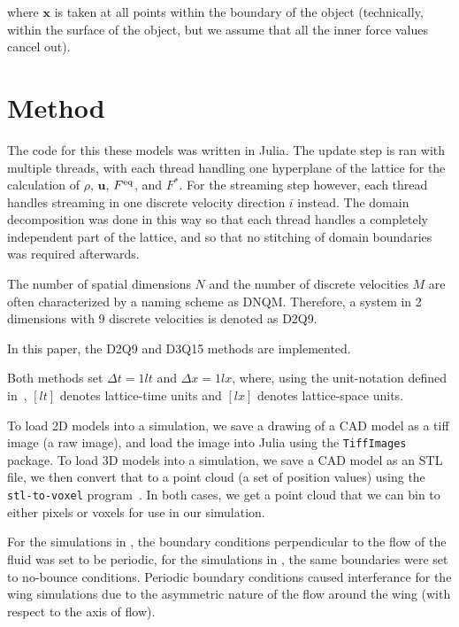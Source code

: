 where $\mathbf x$ is taken at all points within the boundary of the object (technically, within the surface of the object, but we assume that all the inner force values cancel out).



\section{Method}
The code for this these models was written in Julia.
The update step is ran with multiple threads, with each thread handling one hyperplane of the lattice for the calculation of $\rho$, $\mathbf u$, $F^{\textnormal{eq}}$, and $F^{*}$.
For the streaming step however, each thread handles streaming in one discrete velocity direction $i$ instead.
The domain decomposition was done in this way so that each thread handles a completely independent part of the lattice, and so that no stitching of domain boundaries was required afterwards.


The number of spatial dimensions $N$ and the number of discrete velocities $M$ are often characterized by a naming scheme as DNQM. Therefore, a system in 2 dimensions with 9 discrete velocities is denoted as D2Q9.

In this paper, the D2Q9 and D3Q15 methods are implemented.

Both methods set $\Delta t = 1 lt$ and $\Delta x = 1 lx$, where, using the unit-notation defined in~\cite{sukop_lattice_2006}, $[lt]$ denotes lattice-time units and $[lx]$ denotes lattice-space units.


To load 2D models into a simulation, we save a drawing of a CAD model as a tiff image (a raw image), and load the image into Julia using the \verb|TiffImages|~\cite{nagy_tlnagytiffimagesjl_2025} package.
To load 3D models into a simulation, we save a CAD model as an STL file, we then convert that to a point cloud (a set of position values) using the \verb|stl-to-voxel| program~\cite{pederkoff_cpederkoffstl--voxel_2025}.
In both cases, we get a point cloud that we can bin to either pixels or voxels for use in our simulation.

For the simulations in , the boundary conditions perpendicular to the flow of the fluid was set to be periodic, for the simulations in , the same boundaries were set to no-bounce conditions.
Periodic boundary conditions caused interferance for the wing simulations due to the asymmetric nature of the flow around the wing (with respect to the axis of flow).



